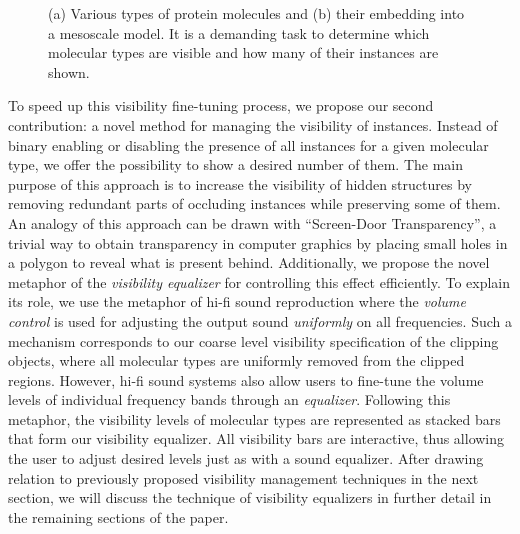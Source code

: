\begin{figure}[t]
\centering
{}
\caption{\label{fig:which} (a) Various types of protein molecules and (b) their embedding into a mesoscale  model. It is a demanding task to determine which molecular types are visible and how many of their instances are shown.}
\vspace{-5mm}
\end{figure}


To speed up this visibility fine-tuning process, we propose our second contribution: a novel method for managing the visibility of instances. Instead of binary enabling or disabling the presence of all instances for a given molecular type, we offer the possibility to show a desired number of them.
The main purpose of this approach is to increase the visibility of hidden structures by removing redundant parts of occluding instances while preserving some of them.
An analogy of this approach can be drawn with ``Screen-Door Transparency'', a trivial way to obtain transparency in computer graphics by placing small holes in a polygon to reveal what is present behind.
Additionally, we propose the novel metaphor of the \emph{visibility equalizer} for controlling this effect efficiently.
To explain its role, we use the metaphor of hi-fi sound reproduction where the \textit{volume control} is used for adjusting the output sound \textit{uniformly} on all frequencies. 
Such a mechanism corresponds to our coarse level visibility specification of the clipping objects, where all molecular types are uniformly removed from the clipped regions.
However, hi-fi sound systems also allow users to fine-tune the volume levels of individual frequency bands through an \emph{equalizer}.
Following this metaphor, the visibility levels of molecular types are represented as stacked bars that form our visibility equalizer.
All visibility bars are interactive, thus allowing the user to adjust desired levels just as with a sound equalizer. After drawing relation to previously proposed visibility management techniques in the next section, we will discuss the technique of visibility equalizers in further detail in the remaining sections of the paper.
